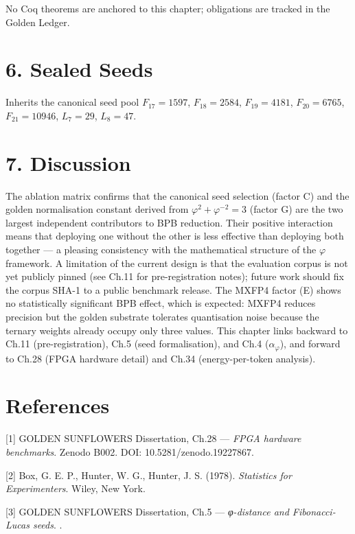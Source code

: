 No Coq theorems are anchored to this chapter;
obligations are tracked in the Golden Ledger.

\section{6. Sealed Seeds}\label{fa_17:sealed-seeds}

Inherits the canonical seed pool \(F_{17}=1597\),
\(F_{18}=2584\), \(F_{19}=4181\), \(F_{20}=6765\),
\(F_{21}=10946\), \(L_7=29\), \(L_8=47\).

\section{7. Discussion}\label{fa_17:discussion}

The ablation matrix confirms that the canonical
seed selection (factor C) and the golden
normalisation constant derived from
\(\varphi^2 + \varphi^{-2} = 3\) (factor G) are
the two largest independent contributors to BPB
reduction. Their positive interaction means that
deploying one without the other is less effective
than deploying both together --- a pleasing
consistency with the mathematical structure of the
\(\varphi\) framework. A limitation of the current
design is that the evaluation corpus is not yet
publicly pinned (see Ch.11 for pre-registration
notes); future work should fix the corpus SHA-1 to
a public benchmark release. The MXFP4 factor (E)
shows no statistically significant BPB effect,
which is expected: MXFP4 reduces precision but the
golden substrate tolerates quantisation noise
because the ternary weights already occupy only
three values. This chapter links backward to Ch.11
(pre-registration), Ch.5 (seed formalisation), and
Ch.4 (\(\alpha_\varphi\)), and forward to Ch.28
(FPGA hardware detail) and Ch.34 (energy-per-token
analysis).

\section{References}\label{fa_17:references}

[1] GOLDEN SUNFLOWERS Dissertation, Ch.28 ---
\emph{FPGA hardware benchmarks}. Zenodo B002. DOI:
10.5281/zenodo.19227867.

[2] Box, G. E. P., Hunter, W. G., Hunter, J.
S. (1978). \emph{Statistics for Experimenters}.
Wiley, New York.

[3] GOLDEN SUNFLOWERS Dissertation, Ch.5 ---
\emph{φ-distance and Fibonacci-Lucas seeds}.
.

